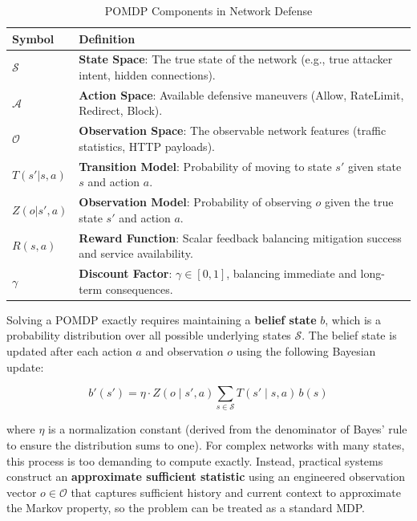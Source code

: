 \documentclass[12pt,a4paper]{report}
\begin{document}
\begin{table}[htbp]
\centering
\caption{POMDP Components in Network Defense}
\label{tab:pomdp_components}
\begin{tabular}{C{1.5cm} L{13cm}}
\toprule
\textbf{Symbol} & \textbf{Definition} \\
\midrule
$\mathcal{S}$ & \textbf{State Space}: The true state of the network (e.g., true attacker intent, hidden connections). \\
$\mathcal{A}$ & \textbf{Action Space}: Available defensive maneuvers (Allow, RateLimit, Redirect, Block). \\
$\mathcal{O}$ & \textbf{Observation Space}: The observable network features (traffic statistics, HTTP payloads). \\
$T(s'|s,a)$ & \textbf{Transition Model}: Probability of moving to state $s'$ given state $s$ and action $a$. \\
$Z(o|s',a)$ & \textbf{Observation Model}: Probability of observing $o$ given the true state $s'$ and action $a$. \\
$R(s,a)$ & \textbf{Reward Function}: Scalar feedback balancing mitigation success and service availability. \\
$\gamma$ & \textbf{Discount Factor}: $\gamma \in [0, 1]$, balancing immediate and long-term consequences. \\
\bottomrule
\end{tabular}
\end{table}

Solving a POMDP exactly requires maintaining a \textbf{belief state} $b$, which is a probability distribution over all possible underlying states $\mathcal{S}$. The belief state is updated after each action $a$ and observation $o$ using the following Bayesian update:

\begin{equation}
b'(s') = \eta \cdot Z(o\mid s',a) \sum_{s \in \mathcal{S}} T(s'\mid s,a)\, b(s)
\end{equation}

where $\eta$ is a normalization constant (derived from the denominator of Bayes' rule to ensure the distribution sums to one). For complex networks with many states, this process is too demanding to compute exactly. Instead, practical systems construct an \textbf{approximate sufficient statistic} using an engineered observation vector $o \in \mathcal{O}$ that captures sufficient history and current context to approximate the Markov property, so the problem can be treated as a standard MDP.
\end{document}
